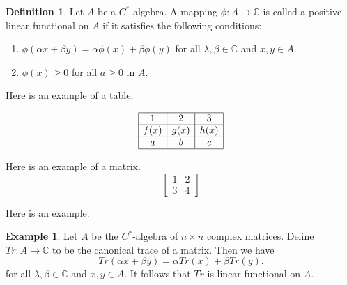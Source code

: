 \documentclass[12pt, reqno]{amsart}
\theoremstyle{definition}
\newtheorem{definition}[theorem]{Definition}
\newtheorem{example}[theorem]{Example}
\theoremstyle{remark}
\numberwithin{equation}{section}
\begin{document}
\begin{definition} Let $A$ be a $C^*$-algebra. A mapping
$\phi :A\rightarrow \mathbb{C} $ is
called a positive linear functional on $A$ if it satisfies the following conditions:

\begin{enumerate}

\item $\phi(\alpha x+\beta y)=\alpha \phi(x)+\beta\phi(y)$ for all $\lambda ,\beta \in  \mathbb{C}$ and $x,y\in A$.

\item $\phi(x)\geq 0$ for all $a\geq 0$ in $A$.
\end{enumerate}
\end{definition}


Here is an example of a table.

\begin{table}[ht]
\caption{}\label{eqtable}
\renewcommand\arraystretch{1.5}
\noindent\[
\begin{array}{|c|c|c|}
\hline
1&2&3\\
\hline f(x)&g(x)&h(x)\\
\hline a&b&c\\
\hline
\end{array}
\]
\end{table}

Here is an example of a matrix.
\begin{equation*}
\begin{bmatrix}
1 & 2 \\
3 &  4
\end{bmatrix}
\end{equation*}


Here is an example.


\begin{example} Let $A$ be the $C^*$-algebra of $n\times n$ complex matrices. Define $Tr: A\rightarrow \mathbb{C}$ to be the canonical trace of a matrix. Then we have
\begin{equation}\label{2.1}
Tr(\alpha x+\beta y)=\alpha Tr(x)+\beta Tr(y).
\end{equation}
for all $\lambda ,\beta \in  \mathbb{C}$ and $x,y\in A$. It follows that $Tr$ is linear functional on $A$.
\end{example}
\end{document}
